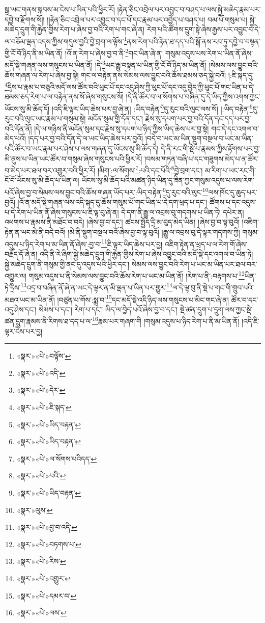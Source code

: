 སྒྲ་ཡང་གནས་སྐབས་མ་ངེས་པ་ཡིན་པའི་ཕྱིར་རོ། །རྟེན་ཅིང་འབྲེལ་པར་འབྱུང་བ་བཤད་པ་ལས་སྐྱེ་མཆེད་རྣམ་པར་དབྱེ་བ་རྫོགས་སོ།། །།རྟེན་ཅིང་འབྲེལ་པར་འབྱུང་བ་དང་པོ་དང་རྣམ་པར་འབྱེད་པ་བཤད་པ། བམ་པོ་གསུམ་པ། སྐྱེ་མཆེད་དྲུག་གི་རྐྱེན་གྱིས་རེག་པ་ཞེས་བྱ་བའི་རེག་པ་གང་ཞེ་ན། རེག་པའི་ཚོགས་དྲུག་སྟེ་ཞེས་རྒྱས་པར་འབྱུང་བ་དེ་ལ་བཅོམ་ལྡན་འདས་ཀྱིས་གདུལ་བྱའི་བྱེ་བྲག་ལ་ལྟོས་\footnote{«སྣར་»«པེ་»བལྟོས་}ནས་རེག་པའི་རྟེན་ཐ་དད་པའི་སྒོ་ནས་རབ་ཏུ་དབྱེ་བ་བསྟན་གྱི་ངོ་བོ་ཉིད་ནི་མ་ཡིན་ནོ། །འོ་ན་རེག་པ་ཞེས་བྱ་བ་ནི་\footnote{«སྣར་»«པེ་»འདི་}གང་ཡིན་ཞེ་ན། གསུམ་འདུས་པས་རེག་པ་ཡིན་ནོ་ཞེས་མདོ་སྡེ་གཞན་ལས་གསུངས་པ་ཡིན་ནོ། །དེ་\footnote{«སྣར་»«པེ་»དེར་}ཡང་རྒྱུ་བསྟན་པ་ཡིན་གྱི་ངོ་བོ་ཉིད་མ་ཡིན་ནོ། །སེམས་ལས་བྱུང་བའི་ཆོས་གཞན་ལ་རེག་པ་ཞེས་བྱ་སྟེ། གང་ལ་བརྟེན་ནས་སེམས་ལས་བྱུང་བའི་ཆོས་ཐམས་ཅད་སྐྱེ་བའོ། །:ཇི་སྐད་དུ་\footnote{«སྣར་»«པེ་»ཇི་སྐད་}དྲིས་པ་རྣམ་པ་བཅུའི་མདོ་ལས་ཚོར་བའི་ཕུང་པོ་དང་འདུ་ཤེས་ཀྱི་ཕུང་པོ་དང་འདུ་བྱེད་ཀྱི་ཕུང་པོ་གང་ཡིན་པ་དེ་ཐམས་ཅད་རེག་པ་ལ་བརྟེན་ནས་སོ་ཞེས་གསུངས་སོ། །དེ་ནི་ཚོར་བ་ལ་སོགས་པ་བཞིན་དུ་དེ་ཡིད་ཀྱིས་འགས་ཀྱང་ཡོངས་སུ་མི་ཆོད་དོ། །འདི་ཇི་ལྟར་ཡིད་ཆེས་པར་བྱ་ཞེ་ན། :ཡིད་བརྟེན་\footnote{«སྣར་»«པེ་»ཡིད་བརྟན་}དུ་རུང་བའི་ལུང་ལས་སོ། །:ཡིད་བརྟེན་\footnote{«སྣར་»«པེ་»ཡིད་བརྟན་}དུ་རུང་བའི་ལུང་ཡང་རྣམ་པ་གསུམ་སྟེ། མངོན་སུམ་གྱི་དོན་དང་། རྗེས་སུ་དཔག་པར་བྱ་བའི་དོན་དང་དད་པར་བྱ་བའི་དོན་ནོ། །དེ་ལ་གཉིས་ནི་མངོན་སུམ་དང་རྗེས་སུ་དཔག་པ་ཉིད་ཀྱིས་ཡིད་ཆེས་པར་བྱ་སྟེ། གང་དེ་དང་འགལ་བ་མེད་པའོ། །དད་པར་བྱ་བའི་དོན་དེ་ལ་ཡང་ཡིད་ཆེས་པར་བྱའོ། །བདེ་བ་ཡང་མ་ཡིན་སྡུག་བསྔལ་བ་ཡང་མ་ཡིན་པའི་ཚོར་བ་ཡང་རྣམ་པར་ཤེས་པ་ལས་གཞན་དུ་ཡོངས་སུ་མི་ཆོད་དེ། དེ་ནི་རང་གི་སྡེ་པ་རྣམས་ཀྱིས་རྟོགས་པར་བྱ་མི་ནུས་པ་ཡིན་ཡང་ཚོར་བ་གསུམ་ཞེས་གསུངས་པའི་ཕྱིར་རོ། །བསམ་གཏན་བཞི་པ་དང་གཟུགས་མེད་པ་ན་ཚོར་བ་མེད་པར་ཐལ་བར་འགྱུར་བའི་ཕྱིར་རོ། །མིག་:ལ་སོགས་\footnote{«སྣར་»«པེ་»ལ་སོགས་པའིདད་}:པའི་དང་པོའི་\footnote{«སྣར་»«པེ་»པའི་}བྱེ་བྲག་དང་། མ་རིག་པ་ཡང་རང་གི་ངོ་བོ་ཡོངས་སུ་མི་ཆོད་པ་ཡིན་ལ། ཡོངས་སུ་མི་ཆོད་པའི་མཚན་ཉིད་ཡིན་དུ་ཟིན་ཀྱང་གསུམ་འདུས་པ་ལས་རེག་པའོ་ཞེས་བྱ་བ་སེམས་ལས་བྱུང་བའི་ཆོས་གཞན་ཡོད་པར་:ཡིད་བརྟེན་\footnote{«སྣར་»«པེ་»ཡིད་བརྟན་}དུ་རུང་བའི་ལུང་\footnote{«སྣར་»ལུས་}ལས་ཁོང་དུ་ཆུད་པར་བྱའོ། །འོ་ན་མདོ་སྡེ་གཞན་ལས་འདི་སྐད་དུ་ཆོས་གསུམ་པོ་གང་ཡིན་པ་དེ་དག་ཕྲད་པ་དང་། ཚོགས་པ་དང་འདུས་པ་དེ་རེག་པ་ཡིན་ནོ་ཞེས་གསུངས་པ་ཇི་ལྟ་བུ་ཞེ་ན། དེ་དག་ནི་རྒྱུ་ལ་འབྲས་བུ་གདགས་པ་ཡིན་ཏེ། དཔེར་ན། འཕགས་པ་རྣམས་ནི་མཐོང་བ་བདེ། །ཞེས་བྱ་བ་དང་། ཚངས་སྤྱོད་དྲི་མ་བུད་མེད་ཡིན། །ཞེས་བྱ་བ་ལྟ་བུའོ། །འཇིག་རྟེན་ན་ཡང་མེ་ནི་བདེ་བའོ། །མེ་ནི་སྡུག་བསྔལ་བའོ་ཞེས་བྱ་བ་ལྟ་བུའོ། །རྒྱུ་ལ་འབྲས་བུ་དེ་ལྟར་གདགས་ཀྱི། གསུམ་འདུས་པ་ཉིད་རེག་པ་མ་ཡིན་ནོ་ཞེས་:བྱ་བ་\footnote{«སྣར་»«པེ་»བྱ་བ་འདི་}ཇི་ལྟར་ཡིད་ཆེས་པར་བྱ། འཇིག་རྟེན་ན་ཕྲད་པ་ལ་རེག་གོ་ཞེས་བརྗོད་དོ་ཞེ་ན། འདི་ནི་རེ་ཞིག་སྐྱེ་མཆེད་དྲུག་གི་རྐྱེན་གྱིས་རེག་པ་ཞེས་འབྱུང་བའི་མདོ་སྡེ་དང་འགལ་བ་ཡིན་ཏེ། སྐྱེ་མཆེད་དྲུག་ནི་གསུམ་གྱི་ནང་དུ་འདུས་པའི་ཕྱིར་དང་། སེམས་ལས་བྱུང་བའི་རེག་པ་ཡང་མ་ཡིན་པར་ཐལ་བར་འགྱུར་ལ། གསུམ་འདུས་པ་ནི་སེམས་ལས་བྱུང་བའི་ཆོས་རེག་པ་ཡང་མ་ཡིན་ནོ། །རེག་པ་ནི་:བརྟགས་པ་\footnote{«སྣར་»«པེ་»བཏགས་པ་}ཡིན་ཏེ་དྲིས་\footnote{«སྣར་»«པེ་»རིས་}འདྲ་བ་བཞིན་ནོ་ཞེ་ན་ཡང་དེ་ལྟར་ན་མི་ལྡན་པ་ཡིན་པར་གྱུར་\footnote{«སྣར་»«པེ་»འགྱུར་}ལ་དེ་ལྟ་བུ་ནི་སྡེ་པ་གང་གི་གྲུབ་པའི་མཐའ་ཡང་མ་ཡིན་ནོ། །བཙུན་པ་གོས་:སྨྲ་བ་\footnote{«སྣར་»«པེ་»དམར་བ་}དང་མདོ་སྡེ་འདི་ཉིད་ལས་གསུངས་པ་མིང་གང་ཞེ་ན། ཚོར་བ་དང་འདུ་ཤེས་དང་། སེམས་པ་དང་། རེག་པ་དང་། ཡིད་ལ་བྱེད་པའོ་ཞེས་བྱ་བ་དང་། སྡེ་ཚན་དྲུག་པ་དྲུག་ལས་ཀྱང་སྡེ་ཚན་དྲུག་རྣམས་ནི་རིགས་ཐ་དད་པ་ལ་\footnote{«སྣར་»«པེ་»ལས་}རྣམ་པར་གཞག་གི །གསུམ་འདུས་པ་ཉིད་རེག་པ་ནི་མ་ཡིན་ནོ། །འདི་ཇི་ལྟར་ངེས་པར་བྱ། 